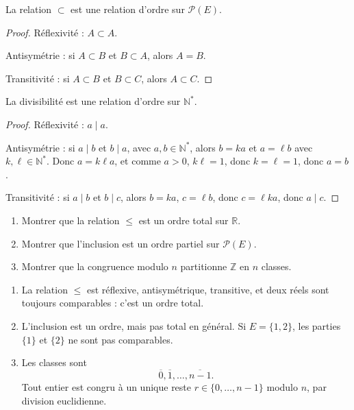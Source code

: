 \documentclass[11pt,a4paper]{article}
\newcommand{\Ns}{\mathbb{N}^*}
\newcommand{\Z}{\mathbb{Z}}
\newcommand{\R}{\mathbb{R}}
\newcommand{\quatreetoiles}{\(\star\star\star\star\)}
\begin{document}
\begin{propositionbox}[inclusion]
La relation \(\subset\) est une relation d'ordre sur \(\mathcal P(E)\).
\end{propositionbox}

\begin{proof}
Réflexivité : \(A\subset A\).

Antisymétrie : si \(A\subset B\) et \(B\subset A\), alors \(A=B\).

Transitivité : si \(A\subset B\) et \(B\subset C\), alors \(A\subset C\).
\end{proof}

\begin{propositionbox}[divisibilité]
La divisibilité est une relation d'ordre sur \(\Ns\).
\end{propositionbox}

\begin{proof}
Réflexivité : \(a\mid a\).

Antisymétrie : si \(a\mid b\) et \(b\mid a\), avec \(a,b\in\Ns\), alors \(b=ka\) et \(a=\ell b\) avec \(k,\ell\in\Ns\). Donc \(a=k\ell a\), et comme \(a>0\), \(k\ell=1\), donc \(k=\ell=1\), donc \(a=b\).

Transitivité : si \(a\mid b\) et \(b\mid c\), alors \(b=ka\), \(c=\ell b\), donc \(c=\ell k a\), donc \(a\mid c\).
\end{proof}

\begin{exercicebox}[6 -- Relations -- \quatreetoiles]
\begin{enumerate}
    \item Montrer que la relation \(\leq\) est un ordre total sur \(\R\).
    \item Montrer que l'inclusion est un ordre partiel sur \(\mathcal P(E)\).
    \item Montrer que la congruence modulo \(n\) partitionne \(\Z\) en \(n\) classes.
\end{enumerate}
\end{exercicebox}

\begin{correctionbox}[6]
\begin{enumerate}
    \item La relation \(\leq\) est réflexive, antisymétrique, transitive, et deux réels sont toujours comparables : c'est un ordre total.
    \item L'inclusion est un ordre, mais pas total en général. Si \(E=\{1,2\}\), les parties \(\{1\}\) et \(\{2\}\) ne sont pas comparables.
    \item Les classes sont
    \[
    \overline 0,\overline 1,\dots,\overline{n-1}.
    \]
    Tout entier est congru à un unique reste \(r\in\{0,\dots,n-1\}\) modulo \(n\), par division euclidienne.
\end{enumerate}
\end{correctionbox}
\end{document}
